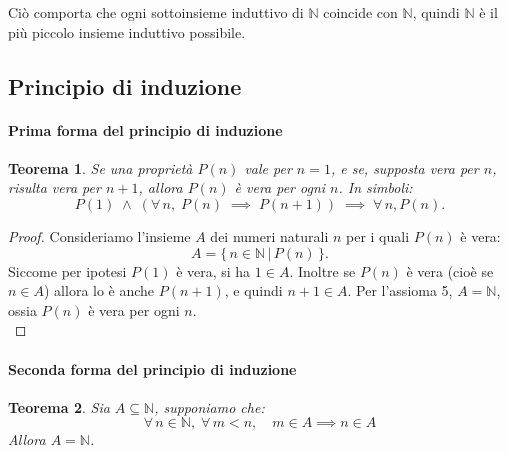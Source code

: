 \documentclass{article}
\theoremstyle{plain}
\newtheorem{thm}{Teorema}[section]
\theoremstyle{definition}
\theoremstyle{remark}
\begin{document}
\vspace{10pt}

Ciò comporta che ogni sottoinsieme induttivo di $\mathbb{N}$ coincide con $\mathbb{N}$, quindi $\mathbb{N}$ è il più piccolo insieme induttivo possibile.

\vspace{10pt}

\subsection{Principio di induzione}

\vspace{10pt}

\paragraph{Prima forma del principio di induzione}
\begin{bxthm}
\begin{thm}
    Se una proprietà $P(n)$ vale per $n=1$, e se, supposta vera per $n$, risulta vera per $n+1$, allora $P(n)$ è vera per ogni $n$.
    In simboli:
    \[P(1)\;\land\;(\forall\,n,\;P(n)\;\implies\;P(n+1))\;\implies\;\forall\,n,P(n).\]
\end{thm}
\end{bxthm}
\begin{proof}
    Consideriamo l'insieme $A$ dei numeri naturali $n$ per i quali $P(n)$ è vera:
    \[A=\{\,n\in\mathbb{N}\,|\,P(n)\,\}.\]
    Siccome per ipotesi $P(1)$ è vera, si ha $1\in A$. Inoltre se $P(n)$ è vera (cioè se $n\in A$) allora lo è anche $P(n+1)$, e quindi $n+1\in A$. 
    Per l'assioma 5, $A=\mathbb{N}$, ossia $P(n)$ è vera per ogni $n$.\\
\end{proof}

\vspace{10pt}

\paragraph{Seconda forma del principio di induzione}
\begin{bxthm}
\begin{thm}
    Sia $A\subseteq\mathbb{N}$, supponiamo che:
    \[
        \forall\, n\in\mathbb{N},\;\forall\, m<n,\quad m\in A\implies n\in A
    \]
    Allora $A=\mathbb{N}$.
\end{thm}
\end{bxthm}
\end{document}
